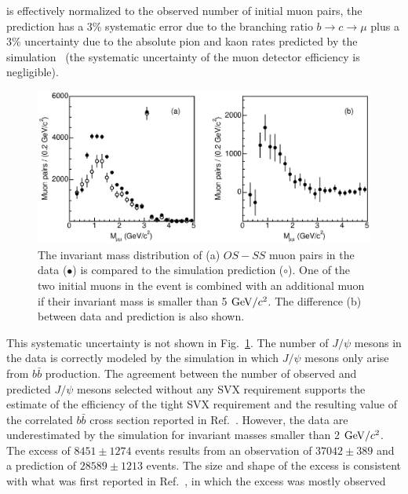 \documentclass[aps,prd,preprint,floatfix,nofootinbib,superscriptaddress,showpacs,amssymb]{revtex4}
\begin{document}
 is effectively normalized to the observed number of initial muon pairs,
 the prediction has a 3\% systematic error due to the branching ratio 
 $b \rightarrow c \rightarrow \mu$ plus a 3\%  uncertainty due to the 
 absolute pion and kaon rates predicted by the simulation~\cite{bbxs}
 (the systematic uncertainty of the muon detector efficiency is negligible).
 \begin{figure}
 \begin{center}
 \vspace{-0.3in}
 \leavevmode
 \includegraphics*[width=\textwidth]{fa0_8.eps}
 \caption[] {The invariant mass distribution of (a) $OS-SS$ muon pairs in 
             the data ($\bullet$) is compared to the simulation prediction
             ($\circ$). One of the two initial muons in the event is combined
             with an additional muon if their invariant mass is smaller than
             5 ${\rm GeV/}c^2$. The difference (b) between data and prediction is
             also shown.}
 \label{fig:fig_8}
 \end{center}
 \end{figure}
 This systematic uncertainty is not shown in Fig.~\ref{fig:fig_8}.
 The number of $J/\psi$ mesons in the data is correctly
 modeled by the simulation in which  $J/\psi$ mesons only arise from
 $b\bar{b}$ production. The agreement between the number of observed 
 and predicted $J/\psi$ mesons selected without any SVX requirement
 supports the estimate of the efficiency of the tight SVX requirement
 and the resulting value of the correlated $b\bar{b}$ cross section
 reported in Ref.~\cite{bbxs}. However, the data are underestimated
 by the simulation for invariant masses smaller than 2 ${\rm GeV/}c^2$.
 The excess of $8451 \pm 1274$ events results from an observation
 of $37042 \pm 389$ and a prediction of $28589\pm 1213$ events.
 The size and shape of the excess is consistent with what was first
 reported in Ref.~\cite{dilb}, in which the excess was mostly observed
\end{document}
